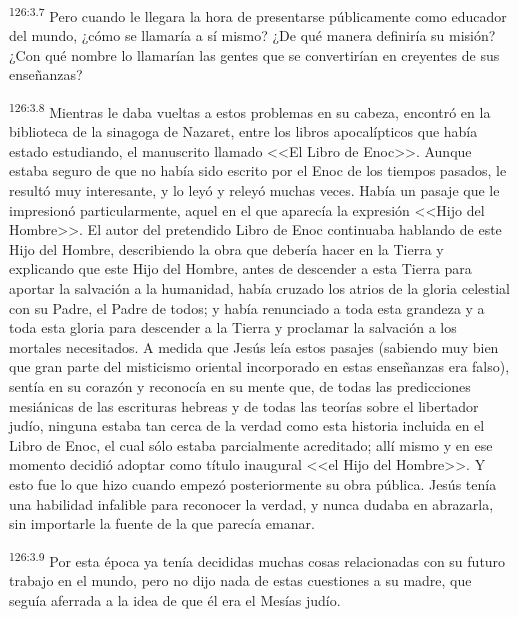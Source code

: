 \par 
\textsuperscript{126:3.7} Pero cuando le llegara la hora de presentarse públicamente como educador del mundo, ¿cómo se llamaría a sí mismo? ¿De qué manera definiría su misión? ¿Con qué nombre lo llamarían las gentes que se convertirían en creyentes de sus enseñanzas?

\par 
\textsuperscript{126:3.8} Mientras le daba vueltas a estos problemas en su cabeza, encontró en la biblioteca de la sinagoga de Nazaret, entre los libros apocalípticos que había estado estudiando, el manuscrito llamado <<El Libro de Enoc>>. Aunque estaba seguro de que no había sido escrito por el Enoc de los tiempos pasados, le resultó muy interesante, y lo leyó y releyó muchas veces. Había un pasaje que le impresionó particularmente, aquel en el que aparecía la expresión <<Hijo del Hombre>>. El autor del pretendido Libro de Enoc continuaba hablando de este Hijo del Hombre, describiendo la obra que debería hacer en la Tierra y explicando que este Hijo del Hombre, antes de descender a esta Tierra para aportar la salvación a la humanidad, había cruzado los atrios de la gloria celestial con su Padre, el Padre de todos; y había renunciado a toda esta grandeza y a toda esta gloria para descender a la Tierra y proclamar la salvación a los mortales necesitados. A medida que Jesús leía estos pasajes (sabiendo muy bien que gran parte del misticismo oriental incorporado en estas enseñanzas era falso), sentía en su corazón y reconocía en su mente que, de todas las predicciones mesiánicas de las escrituras hebreas y de todas las teorías sobre el libertador judío, ninguna estaba tan cerca de la verdad como esta historia incluida en el Libro de Enoc, el cual sólo estaba parcialmente acreditado; allí mismo y en ese momento decidió adoptar como título inaugural <<el Hijo del Hombre>>. Y esto fue lo que hizo cuando empezó posteriormente su obra pública. Jesús tenía una habilidad infalible para reconocer la verdad, y nunca dudaba en abrazarla, sin importarle la fuente de la que parecía emanar.

\par 
\textsuperscript{126:3.9} Por esta época ya tenía decididas muchas cosas relacionadas con su futuro trabajo en el mundo, pero no dijo nada de estas cuestiones a su madre, que seguía aferrada a la idea de que él era el Mesías judío.

